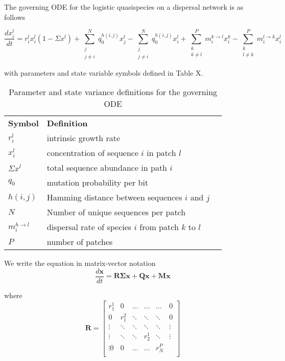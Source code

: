 \documentclass[12pt]{article}
\begin{document}
The governing ODE for the logistic quasispecies on a dispersal network is as follows 

\[ \frac{dx_{i}^{l}}{dt} = r_i^l x_i^l\left(1 - \Sigma x^l\right) 
		 + \sum_{\substack{j\\j \neq i}}^N q_0^{h(i,j)}x_j^l
		 - \sum_{\substack{j\\j \neq i}}^N q_0^{h(i,j)}x_i^l
		 + \sum_{\substack{k\\k \neq l}}^{P}m_{i}^{k \rightarrow l}x_{i}^{k}		
		 -  \sum_{\substack{k\\l \neq k}}^{P}m_{i}^{l \rightarrow k} x_{i}^{l} \] 

with parameters and state variable symbols defined in Table X. 

\begin{table}[!h]
\centering
   \caption{Parameter and state variance definitions for the governing ODE} 
\begin{tabular}{lll}
 \textbf{Symbol} &  \textbf{Definition}  \\
 $r_i^l$           & intrinsic growth rate  \\
 $x_i^l$          & concentration of sequence $i$ in patch $l$  \\
 $\Sigma x^l $ & total sequence abundance in path $i$  \\
 $q_0$            & mutation probability  per bit\\
 $h(i,j)$           & Hamming distance between sequences $i$ and $j$\\
 $N$               & Number of unique sequences per patch \\
 $m_i^{h\rightarrow l}$ & dispersal rate of species $i$ from patch $k$ to $l$\\
 $P$  & number of patches 
\end{tabular}
\end{table}

We write the equation in matrix-vector notation
\[ \frac{d \mathbf{x}}{dt} = \mathbf{R\Sigma x}  
		 + \mathbf{Qx}
		 + \mathbf{Mx}\] 
		 
where
\[ \mathbf{R} = \begin{bmatrix}
    r_1^1 & 0        & \dots & \dots & \dots & 0  \\
           0 & r_1^2 & \ddots & \ddots & \ddots & 0 \\
   \vdots & \ddots & \ddots & \ddots & \ddots & \vdots \\
   \vdots & \ddots & \ddots &  r_2^1 & \ddots & \vdots  \\
   \vdots 
           0 &        0 &  \dots  & \dots & r_N^P \\ \end{bmatrix} \]
\end{document}
